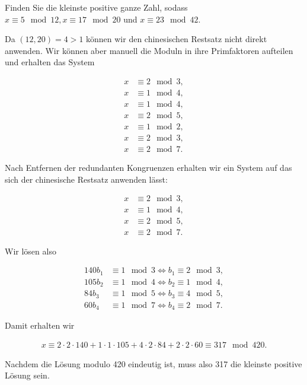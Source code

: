 
\begin{exercise}

Finden Sie die kleinste positive ganze Zahl, sodass $x \equiv 5 \mod{12}, 
x \equiv 17 \mod{20}$ und $x \equiv 23 \mod{42}$.

\end{exercise}


\begin{solution}

Da $(12,20) = 4 > 1$ können wir den chinesischen Restsatz nicht direkt anwenden.
Wir können aber manuell die Moduln in ihre Primfaktoren aufteilen und erhalten das System

\begin{align*}
    x &\equiv 2 \mod{3}, \\
    x &\equiv 1 \mod{4}, \\
    x &\equiv 1 \mod{4}, \\
    x &\equiv 2 \mod{5}, \\
    x &\equiv 1 \mod{2}, \\
    x &\equiv 2 \mod{3}, \\
    x &\equiv 2 \mod{7}.
\end{align*}

Nach Entfernen der redundanten Kongruenzen erhalten wir ein
System auf das sich der chinesische Restsatz anwenden lässt:

\begin{align*}
    x &\equiv 2 \mod{3}, \\
    x &\equiv 1 \mod{4}, \\
    x &\equiv 2 \mod{5}, \\
    x &\equiv 2 \mod{7}.
\end{align*}

Wir lösen also

\begin{align*}
    140b_1 &\equiv 1 \mod{3} \iff b_1 \equiv 2 \mod{3}, \\
    105b_2 &\equiv 1 \mod{4} \iff b_2 \equiv 1 \mod{4}, \\
    84b_3 &\equiv 1 \mod{5} \iff b_3 \equiv 4 \mod{5}, \\
    60b_4 &\equiv 1 \mod{7} \iff b_4 \equiv 2 \mod{7}.
\end{align*}

Damit erhalten wir

\begin{align*}
    x \equiv 2\cdot 2 \cdot 140 + 1 \cdot 1 \cdot 105 + 
    4 \cdot 2 \cdot 84 + 2 \cdot 2 \cdot 60 \equiv 317 \mod{420}.
\end{align*}

Nachdem die Lösung modulo 420 eindeutig ist, muss also 317 die kleinste
positive Lösung sein.

\end{solution}

